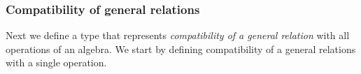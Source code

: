 \subsubsection{Compatibility of general relations}\label{compatibility-of-general-relations}

Next we define a type that represents \emph{compatibility of a general relation} with all operations of an algebra. We start by defining compatibility of a general relations with a single operation.
\ccpad
\begin{code}%
\>[0]\AgdaSpace{}%
\AgdaModule{\AgdaUnderscore{}}\AgdaSpace{}%
\AgdaSymbol{\{}\AgdaSpace{}%
\AgdaSpace{}%
\AgdaSymbol{:}\AgdaSpace{}%
\AgdaSymbol{\}}\AgdaSpace{}%
\AgdaSymbol{\{}\AgdaSpace{}%
\AgdaSymbol{:}\AgdaSpace{}%
\AgdaSpace{}%
\AgdaSpace{}%
\AgdaSymbol{\}}\AgdaSpace{}%
\AgdaSymbol{\{}\AgdaSpace{}%
\AgdaSymbol{:}\AgdaSpace{}%
\AgdaSpace{}%
\AgdaSpace{}%
\AgdaSymbol{\}}\AgdaSpace{}%
\AgdaSymbol{\{}\AgdaSpace{}%
\AgdaSymbol{:}\AgdaSpace{}%
\AgdaSpace{}%
\AgdaSymbol{\}}\AgdaSpace{}%
\<%
\\
%
\\[\AgdaEmptyExtraSkip]%
\>[0][@{}l@{\AgdaIndent{0}}]%
\>[1]\AgdaSpace{}%
\AgdaSymbol{:}\AgdaSpace{}%
\AgdaSpace{}%
\AgdaSpace{}%
\AgdaSpace{}%
\AgdaSpace{}%
\AgdaSpace{}%
\AgdaSpace{}%
\AgdaSpace{}%
\AgdaSpace{}%
\AgdaSpace{}%
\AgdaSpace{}%
\AgdaSpace{}%
\AgdaSpace{}%
\AgdaSpace{}%
\AgdaSpace{}%
\AgdaSpace{}%
\AgdaSpace{}%
\<%
\\
%
\>[1]\AgdaSpace{}%
\AgdaSpace{}%
\AgdaSpace{}%
\AgdaSymbol{=}\AgdaSpace{}%
\AgdaSpace{}%
\AgdaSpace{}%
\AgdaBound{\AgdaUnderscore{}}\AgdaSpace{}%
\AgdaSpace{}%
\AgdaSymbol{(}\AgdaSpace{}%
\AgdaSpace{}%
\AgdaSymbol{))}\AgdaSpace{}%
\<%
\end{code}
